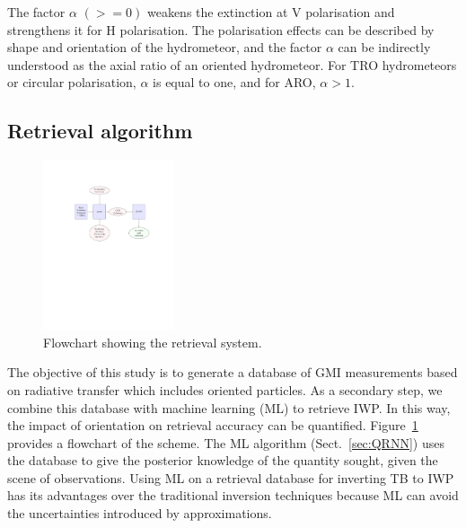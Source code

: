 \documentclass[amt, manuscript]{copernicus}
\begin{document}
The factor $\alpha$ $(>= 0)$  weakens the extinction at V polarisation and strengthens it for H polarisation. The polarisation effects can be described by shape and orientation of the hydrometeor, and the factor $\alpha$ can be indirectly understood as the axial ratio of an oriented hydrometeor. For TRO hydrometeors or circular polarisation, $\alpha$ is equal to one, and for ARO, $\alpha > 1$. 


\subsection{Retrieval algorithm}
\label{sec:retrieval_algo}

\begin{figure}[t]
	\includegraphics[trim=100 410 100 125,clip,height = 50mm, ]{Figures/flowchart.pdf}
	\caption{Flowchart showing the retrieval system.}
	\label{fig:flowchart}
\end{figure}

The objective of this study is to generate a database of GMI measurements based on radiative transfer which includes oriented particles. As a secondary step, we combine this database with machine learning (ML) to retrieve IWP. In this way, the impact of orientation on retrieval accuracy can be quantified. Figure~\ref{fig:flowchart} provides a flowchart of the scheme. The ML algorithm (Sect.~\ref{sec:QRNN}) uses the database to give the posterior knowledge of the quantity sought, given the scene of observations. Using ML on a retrieval database for inverting TB to IWP has its  advantages over the traditional inversion techniques because ML can avoid the uncertainties introduced by approximations. 
\end{document}
